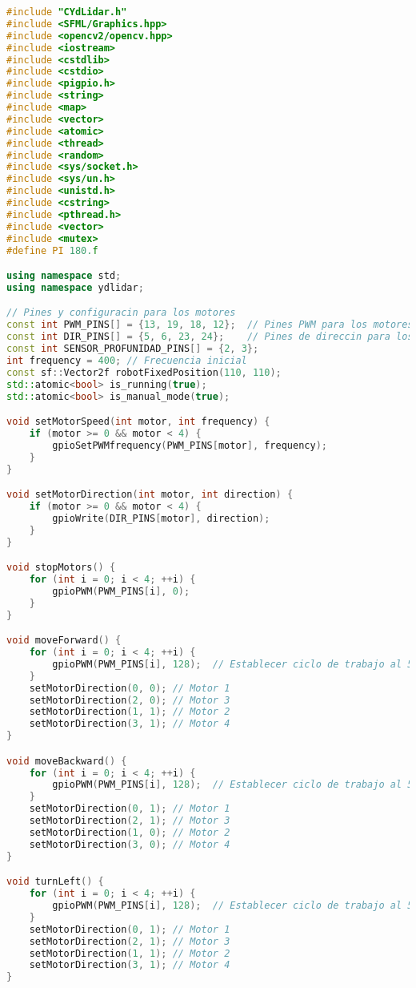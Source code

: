     \begin{lstlisting}[language={C++}, caption={Primer ajuste de c\'odigo}, label={Script}]
#include "CYdLidar.h"
#include <SFML/Graphics.hpp>
#include <opencv2/opencv.hpp>
#include <iostream>
#include <cstdlib>
#include <cstdio>
#include <pigpio.h>
#include <string>
#include <map>
#include <vector>
#include <atomic>
#include <thread>
#include <random>
#include <sys/socket.h>
#include <sys/un.h>
#include <unistd.h>
#include <cstring>
#include <pthread.h>
#include <vector>
#include <mutex>
#define PI 180.f

using namespace std;
using namespace ydlidar;

// Pines y configuracin para los motores
const int PWM_PINS[] = {13, 19, 18, 12};  // Pines PWM para los motores
const int DIR_PINS[] = {5, 6, 23, 24};    // Pines de direccin para los motores
const int SENSOR_PROFUNIDAD_PINS[] = {2, 3};
int frequency = 400; // Frecuencia inicial
const sf::Vector2f robotFixedPosition(110, 110);
std::atomic<bool> is_running(true);
std::atomic<bool> is_manual_mode(true);

void setMotorSpeed(int motor, int frequency) {
    if (motor >= 0 && motor < 4) {
        gpioSetPWMfrequency(PWM_PINS[motor], frequency);
    }
}

void setMotorDirection(int motor, int direction) {
    if (motor >= 0 && motor < 4) {
        gpioWrite(DIR_PINS[motor], direction);
    }
}

void stopMotors() {
    for (int i = 0; i < 4; ++i) {
        gpioPWM(PWM_PINS[i], 0);
    }
}

void moveForward() {
    for (int i = 0; i < 4; ++i) {
        gpioPWM(PWM_PINS[i], 128);  // Establecer ciclo de trabajo al 50%
    }
    setMotorDirection(0, 0); // Motor 1
    setMotorDirection(2, 0); // Motor 3
    setMotorDirection(1, 1); // Motor 2
    setMotorDirection(3, 1); // Motor 4
}

void moveBackward() {
    for (int i = 0; i < 4; ++i) {
        gpioPWM(PWM_PINS[i], 128);  // Establecer ciclo de trabajo al 50%
    }
    setMotorDirection(0, 1); // Motor 1
    setMotorDirection(2, 1); // Motor 3
    setMotorDirection(1, 0); // Motor 2
    setMotorDirection(3, 0); // Motor 4
}

void turnLeft() {
    for (int i = 0; i < 4; ++i) {
        gpioPWM(PWM_PINS[i], 128);  // Establecer ciclo de trabajo al 50%
    }
    setMotorDirection(0, 1); // Motor 1
    setMotorDirection(2, 1); // Motor 3
    setMotorDirection(1, 1); // Motor 2
    setMotorDirection(3, 1); // Motor 4
}


\end{lstlisting}
